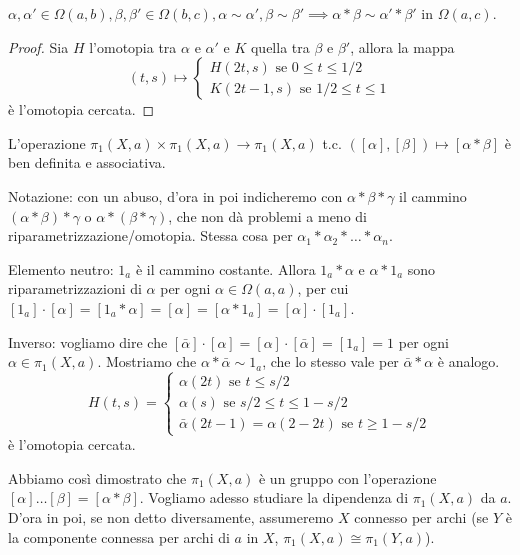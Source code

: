 \begin{lm}
  $\alpha, \alpha' \in \Omega(a, b), \beta, \beta' \in \Omega(b, c), \alpha \sim \alpha', \beta \sim \beta' \implies \alpha * \beta \sim \alpha' * \beta'$ in $\Omega(a, c)$.
\end{lm}

\begin{proof}
  Sia $H$ l'omotopia tra $\alpha$ e $\alpha'$ e $K$ quella tra $\beta$ e $\beta'$, allora la mappa
  $$(t, s) \longmapsto \begin{cases} H(2t, s) \text{ se } 0 \le t \le 1/2 \\ K(2t-1, s) \text{ se } 1/2 \le t \le 1 \end{cases}$$ è l'omotopia cercata.
\end{proof}

\begin{cor}
  L'operazione $\pi_1(X, a) \times \pi_1(X, a) \longrightarrow \pi_1(X, a)$ t.c. $([\alpha], [\beta]) \longmapsto [\alpha * \beta]$ è ben definita e associativa.
\end{cor}

Notazione: con un abuso, d'ora in poi indicheremo con $\alpha * \beta * \gamma$ il cammino $(\alpha * \beta) * \gamma$ o $\alpha * (\beta * \gamma)$, che non dà problemi a meno di riparametrizzazione/omotopia. Stessa cosa per $\alpha_1 * \alpha_2 * \dots * \alpha_n$.

Elemento neutro: $1_a$ è il cammino costante. Allora $1_a * \alpha$ e $\alpha * 1_a$ sono riparametrizzazioni di $\alpha$ per ogni $\alpha \in \Omega(a, a)$, per cui $[1_a]\cdot[\alpha]=[1_a * \alpha]=[\alpha]=[\alpha * 1_a]=[\alpha]\cdot[1_a]$.

Inverso: vogliamo dire che $[\bar{\alpha}]\cdot[\alpha]=[\alpha]\cdot[\bar{\alpha}]=[1_a]=1$ per ogni $\alpha \in \pi_1(X, a)$. Mostriamo che $\alpha * \bar{\alpha} \sim 1_a$, che lo stesso vale per $\bar{\alpha} * \alpha$ è analogo.
$$H(t, s)=\begin{cases} \alpha(2t) \text{ se } t \le s/2 \\ \alpha(s) \text{ se } s/2 \le t \le 1-s/2 \\ \bar{\alpha}(2t-1)=\alpha(2-2t) \text{ se } t \ge 1-s/2 \end{cases}$$ è l'omotopia cercata.

Abbiamo così dimostrato che $\pi_1(X, a)$ è un gruppo con l'operazione $[\alpha]\dots[\beta]=[\alpha * \beta]$. Vogliamo adesso studiare la dipendenza di  $\pi_1(X, a)$ da $a$. D'ora in poi, se non detto diversamente, assumeremo $X$ connesso per archi (se $Y$ è la componente connessa per archi di $a$ in $X$, $\pi_1(X,a ) \cong \pi_1(Y, a)$).

